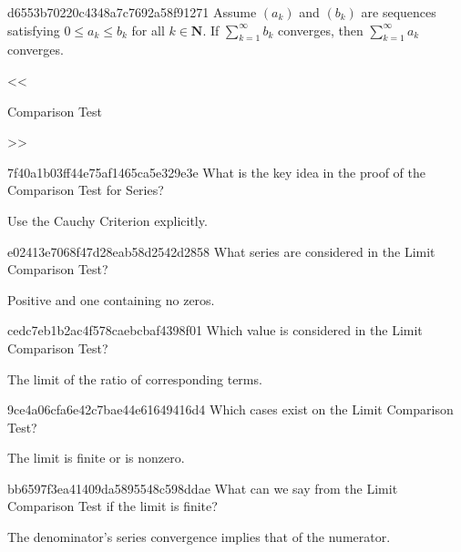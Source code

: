\begin{note}{d6553b70220c4348a7c7692a58f91271}
    Assume \({ (a_k) }\) and \({ (b_k) }\) are sequences satisfying \({ 0 \leq a_k \leq b_k }\) for all \({ k \in \mathbf{N} }\).
    If \({ \sum_{k=1}^{\infty} b_k }\) converges, then \({ \sum_{k=1}^{\infty} a_k }\) converges.

    \begin{center}
        \tiny
        <<\begin{icloze}{1}Comparison Test\end{icloze}>>
    \end{center}
\end{note}

\begin{note}{7f40a1b03ff44e75af1465ca5e329e3e}
    What is the key idea in the proof of the Comparison Test for Series?

    \begin{cloze}{1}
        Use the Cauchy Criterion explicitly.
    \end{cloze}
\end{note}

\begin{note}{e02413e7068f47d28eab58d2542d2858}
    What series are considered in the Limit Comparison Test?

    \begin{cloze}{1}
        Positive and one containing no zeros.
    \end{cloze}
\end{note}

\begin{note}{cedc7eb1b2ac4f578caebcbaf4398f01}
    Which value is considered in the Limit Comparison Test?

    \begin{cloze}{1}
        The limit of the ratio of corresponding terms.
    \end{cloze}
\end{note}

\begin{note}{9ce4a06cfa6e42c7bae44e61649416d4}
    Which cases exist on the Limit Comparison Test?

    \begin{cloze}{1}
        The limit is finite or is nonzero.
    \end{cloze}
\end{note}

\begin{note}{bb6597f3ea41409da5895548c598ddae}
    What can we say from the Limit Comparison Test if the limit is finite?

    \begin{cloze}{1}
        The denominator's series convergence implies that of the numerator.
    \end{cloze}
\end{note}

